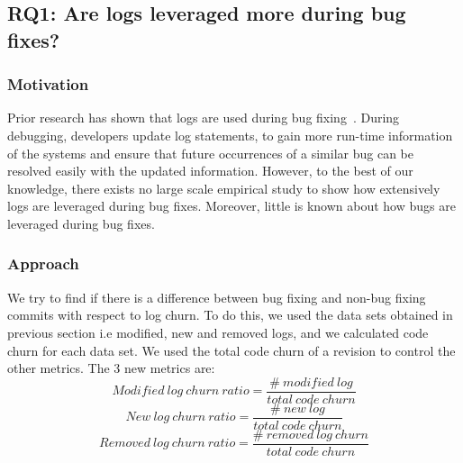 \subsection*{\textbf{RQ1: Are logs leveraged more during bug fixes? }}


\subsubsection*{\textbf{Motivation}}

Prior research has shown that logs are used during bug fixing~\cite{EMSEIAN}. During debugging, developers update log statements, to gain more run-time information of the systems and ensure that future occurrences of a similar bug can be resolved easily with the updated information. 
However, to the best of our knowledge, there exists no large scale empirical study to show how extensively logs are leveraged during bug fixes. Moreover, little is known about how bugs are leveraged during bug fixes. 




\subsubsection*{\textbf{Approach}}

We try to find if there is a difference between bug fixing and non-bug fixing commits with respect to log churn. To do this, we used the data sets obtained in previous section i.e modified, new and removed logs, and we calculated code churn for each data set. We used the total code churn of a revision to control the other metrics. The 3 new metrics are:
\begin{equation}
Modified\ log\ churn\ ratio = \frac{\#\ modified\ log}{total\ code\ churn } 
\label{eq1}
\end{equation}
\begin{equation}
New\ log\ churn\ ratio = \frac{\#\ new\ log}{total\ code\ churn } 
\label{eq2}
\end{equation}
\begin{equation}
Removed\ log\ churn\ ratio = \frac{\#\ removed\ log\ churn}{total\ code\ churn }
\label{eq3} 
\end{equation}

